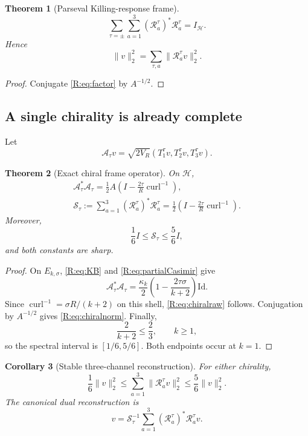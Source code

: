 \documentclass[
 aps,
 prd,
 reprint,
 amsmath,
 amssymb,
 nofootinbib,
 superscriptaddress
]{revtex4-2}
\newtheorem{theorem}{Theorem}[section]
\newtheorem{corollary}[theorem]{Corollary}
\theoremstyle{definition}
\theoremstyle{remark}
\newcommand{\cS}{\mathscr S}
\newcommand{\cA}{\mathscr A}
\newcommand{\cR}{\mathscr R}
\newcommand{\curl}{\operatorname{curl}}
\newcommand{\Id}{\mathrm{Id}}
\begin{document}
\begin{theorem}[Parseval Killing-response frame]
\label{R:thm:parseval}
\begin{equation}
 \boxed{
 \sum_{\tau=\pm}\sum_{a=1}^3
 (\cR_a^\tau)^*\cR_a^\tau
 =
 I_{\mathcal H}.
 }
 \label{R:eq:parseval}
\end{equation}
Hence
\[
       \|v\|_2^2
       =
       \sum_{\tau,a}\|\cR_a^\tau v\|_2^2.
\]
\end{theorem}

\begin{proof}
Conjugate \eqref{R:eq:factor} by $A^{-1/2}$.
\end{proof}

\subsection{A single chirality is already complete}

Let
\[
       \cA_\tau v
       =
       \sqrt{2V_R}
       (T_1^\tau v,T_2^\tau v,T_3^\tau v).
\]

\begin{theorem}[Exact chiral frame operator]
\label{R:thm:chiral}
On $\mathcal H$,
\begin{align}
 \boxed{
 \cA_\tau^*\cA_\tau
 =
 \frac12A
 \left(I-\frac{2\tau}{R}\curl^{-1}\right),
 }
 \label{R:eq:chiralraw}\\
 \boxed{
 \cS_\tau:=
 \sum_{a=1}^3(\cR_a^\tau)^*\cR_a^\tau
 =
 \frac12
 \left(I-\frac{2\tau}{R}\curl^{-1}\right).
 }
 \label{R:eq:chiralnorm}
\end{align}
Moreover,
\begin{equation}
 \boxed{
 \frac16I\le\cS_\tau\le\frac56I,
 }
 \label{R:eq:sharpbounds}
\end{equation}
and both constants are sharp.
\end{theorem}

\begin{proof}
On $E_{k,\sigma}$, \eqref{R:eq:KB} and
\eqref{R:eq:partialCasimir} give
\[
 \cA_\tau^*\cA_\tau
 =
 \frac{\kappa_k}{2}
 \left(1-\frac{2\tau\sigma}{k+2}\right)\Id.
\]
Since
$\curl^{-1}=\sigma R/(k+2)$ on this shell,
\eqref{R:eq:chiralraw} follows.  Conjugation by $A^{-1/2}$ gives
\eqref{R:eq:chiralnorm}.  Finally,
\[
       \frac{2}{k+2}\le\frac23,
       \qquad k\ge1,
\]
so the spectral interval is $[1/6,5/6]$.  Both endpoints occur at $k=1$.
\end{proof}

\begin{corollary}[Stable three-channel reconstruction]
\label{R:cor:three}
For either chirality,
\begin{equation}
 \frac16\|v\|_2^2
 \le
 \sum_{a=1}^3\|\cR_a^\tau v\|_2^2
 \le
 \frac56\|v\|_2^2.
 \label{R:eq:three}
\end{equation}
The canonical dual reconstruction is
\begin{equation}
 \boxed{
 v
 =
 \cS_\tau^{-1}
 \sum_{a=1}^3
 (\cR_a^\tau)^*\cR_a^\tau v.
 }
 \label{R:eq:dual}
\end{equation}
\end{corollary}
\end{document}
